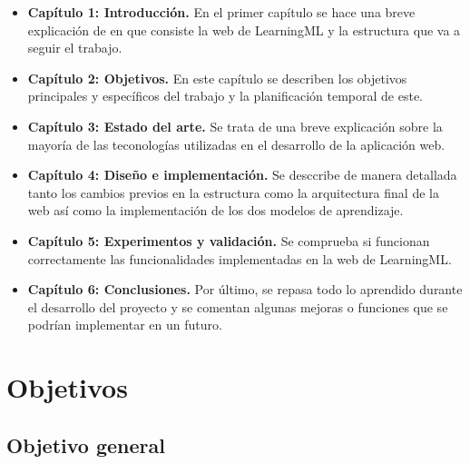 \documentclass[a4paper, 12pt]{book}
\begin{document}
\begin{itemize}
  \item \textbf{Capítulo 1: Introducción.} En el primer capítulo se hace una breve explicación de en que consiste la web de LearningML y la estructura que va a seguir el trabajo.
  
  \item \textbf{Capítulo 2: Objetivos.} En este capítulo se describen los objetivos principales y específicos del trabajo y la planificación temporal de este.
  
  \item \textbf{Capítulo 3: Estado del arte.} Se trata de una breve explicación sobre la mayoría de las teconologías utilizadas en el desarrollo de la aplicación web.

  \item \textbf{Capítulo 4: Diseño e implementación.} Se desccribe de manera detallada tanto los cambios previos en la estructura como la arquitectura final de la web así como la implementación de los dos modelos de aprendizaje.
  
  \item \textbf{Capítulo 5: Experimentos y validación.} Se comprueba si funcionan correctamente las funcionalidades implementadas en la web de LearningML.
  
  \item \textbf{Capítulo 6: Conclusiones.} Por último, se repasa todo lo aprendido durante el desarrollo del proyecto y se comentan algunas mejoras o funciones que se podrían implementar en un futuro.
  
\end{itemize}




\cleardoublepage %
\chapter{Objetivos} %
\label{chap:objetivos} %

\section{Objetivo general} %
\label{sec:objetivo-general} %
\end{document}
